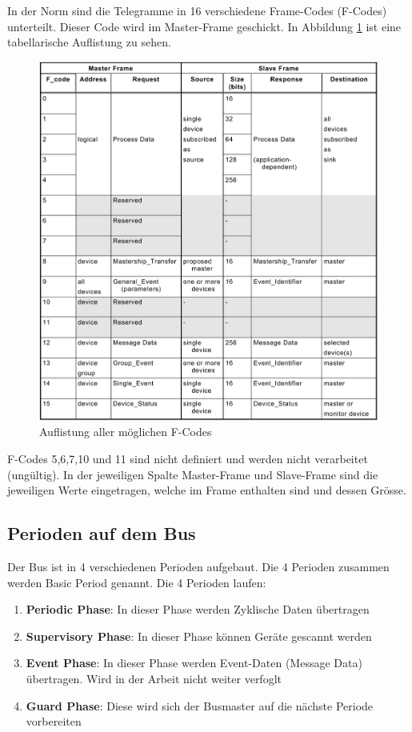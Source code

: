 In der Norm sind die Telegramme in 16 verschiedene Frame-Codes (F-Codes) unterteilt. Dieser Code wird im Master-Frame geschickt. In Abbildung \ref{fig:FCodeListe} ist eine tabellarische Auflistung zu sehen. 

\begin{figure}[H]
    \centering
    \includegraphics[width=0.9\linewidth]{Figures/Chap2/Grundlagen/MVB_DOKU/Frames und Telegramme/F-Code Liste.png}
    \caption{Auflistung aller möglichen F-Codes}
    \label{fig:FCodeListe}
\end{figure}

F-Codes 5,6,7,10 und 11 sind nicht definiert und werden nicht verarbeitet (ungültig). In der jeweiligen Spalte Master-Frame und Slave-Frame sind die jeweiligen Werte eingetragen, welche im Frame enthalten sind und dessen Grösse. 

\subsection{Perioden auf dem Bus}
\label{sub:PeriodeAufDemBus}

Der Bus ist in 4 verschiedenen Perioden aufgebaut. Die 4 Perioden zusammen werden Basic Period genannt. Die 4 Perioden laufen:

\begin{enumerate}
    \item \textbf{Periodic Phase}: In dieser Phase werden Zyklische Daten übertragen
    \item \textbf{Supervisory Phase}: In dieser Phase können Geräte gescannt werden
    \item \textbf{Event Phase}: In dieser Phase werden Event-Daten (Message Data) übertragen. Wird in der Arbeit nicht weiter verfoglt
    \item \textbf{Guard Phase}: Diese wird sich der Busmaster auf die nächste Periode vorbereiten
\end{enumerate}

